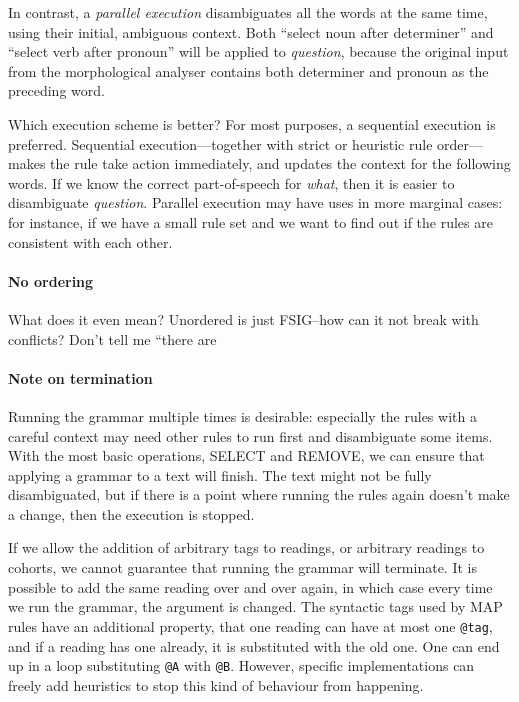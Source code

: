 In contrast, a \emph{parallel execution} disambiguates all the words at the same time, using their initial, ambiguous context. Both ``select noun after determiner'' and ``select verb after pronoun'' will be applied to \emph{question}, because the original input from the morphological analyser contains both determiner and pronoun as the preceding word.

Which execution scheme is better? For most purposes, a sequential execution is preferred.  Sequential execution–--together with strict or heuristic rule order---makes the rule take action immediately, and updates the context for the following words. If we know the correct part-of-speech for \emph{what}, then it is easier to disambiguate \emph{question}.
Parallel execution may have uses in more marginal cases: for instance, if we have a small rule set and we want to find out if the rules are consistent with each other. 


\paragraph{No ordering}

What does it even mean? Unordered is just FSIG--how can it not break with conflicts? Don't tell me ``there are

\paragraph{Note on termination} 
Running the grammar multiple times is desirable: especially the rules
with a careful context may need other rules to run first and
disambiguate some items.
With the most basic operations, SELECT and REMOVE, we can ensure that
applying a grammar to a text will finish. The text might not be fully
disambiguated, but if there is a point where running the rules again
doesn't make a change, then the execution is stopped.

If we allow the addition of arbitrary tags to readings, or arbitrary
readings to cohorts, we cannot guarantee that running the grammar will
terminate. It is possible to add the same reading over and over again,
in which case every time we run the grammar, the argument is changed.
The syntactic tags used by MAP rules have an additional property,
that one reading can have at most one \texttt{@tag}, and if a reading has one
already, it is substituted with the old one. One can end up in a loop
substituting \texttt{@A} with \texttt{@B}.
However, specific implementations can freely add heuristics to stop
this kind of behaviour from happening.

